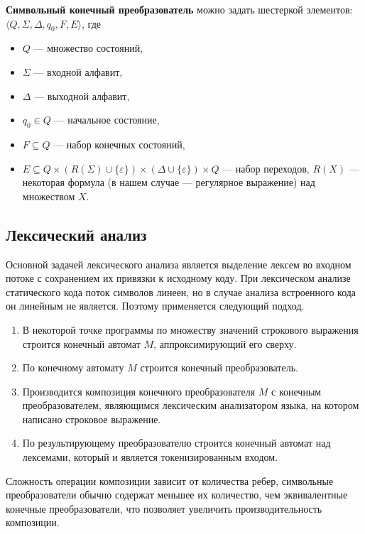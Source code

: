 \documentclass[14pt]{matmex-diploma}
\begin{document}
\textbf{Символьный конечный преобразователь} можно задать шестеркой элементов: 
$\langle Q, \Sigma, \Delta, q_0, F, E \rangle$, где

\begin{itemize}
\item $Q$ --- множество состояний, 
\item $\Sigma$ --- входной алфавит, 
\item $\Delta$ --- выходной алфавит, 
\item $q_0 \in Q$ --- начальное состояние, 
\item $F \subseteq Q$ --- набор конечных состояний, 
\item $E \subseteq Q \times (R(\Sigma) \cup \{\varepsilon\}) \times (\Delta \cup \{\varepsilon\})  \times Q$ --- набор переходов, $R(X)$ --- некоторая формула (в нашем случае --- регулярное выражение) над множеством $X$.
\end{itemize}

\subsection{Лексический анализ}
Основной задачей лексического анализа является выделение лексем во входном потоке с сохранением их привязки к исходному коду. При лексическом анализе статического кода поток символов линеен, но в случае анализа встроенного кода он линейным не является. Поэтому применяется следующий подход.

\begin{enumerate}
\item В некоторой точке программы по множеству значений строкового выражения строится конечный автомат $M$, аппроксимирующий его сверху.
\item По конечному автомату $M$ строится конечный преобразователь.
\item Производится композиция конечного преобразователя $M$ с конечным преобразователем, являющимся лексическим анализатором языка, на котором написано строковое выражение.
\item По результирующему преобразователю строится конечный автомат над лексемами, который и является токенизированным входом.
\end{enumerate}

Сложность операции композиции зависит от количества ребер, символьные преобразователи обычно содержат меньшее их количество, чем эквивалентные конечные преобразователи, что позволяет увеличить производительность композиции.
\end{document}
